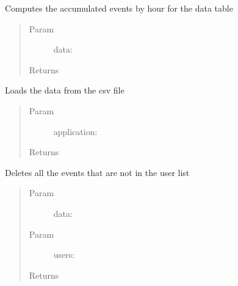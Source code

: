\documentclass[letterpaper,10pt,english]{sphinxmanual}
\begin{document}

\begin{fulllineitems}
\label{index:SuperHubData.hourlyTable}
Computes the accumulated events by hour for the data table
\begin{quote}\begin{description}
\item[{Param }] \leavevmode
data:

\item[{Returns}] \leavevmode


\end{description}\end{quote}

\end{fulllineitems}


\begin{fulllineitems}
\label{index:SuperHubData.readData}
Loads the data from the csv file
\begin{quote}\begin{description}
\item[{Param }] \leavevmode
application:

\item[{Returns}] \leavevmode


\end{description}\end{quote}

\end{fulllineitems}


\begin{fulllineitems}
\label{index:SuperHubData.selectDataUsers}
Deletes all the events that are not in the user list
\begin{quote}\begin{description}
\item[{Param }] \leavevmode
data:

\item[{Param }] \leavevmode
users:

\item[{Returns}] \leavevmode


\end{description}\end{quote}

\end{fulllineitems}
\end{document}
